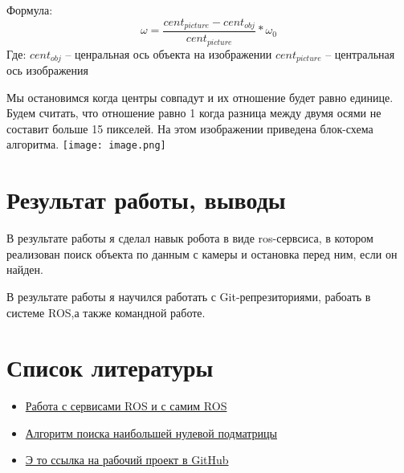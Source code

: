 \documentclass{article}
\begin{document}
    \newline
    Формула:
    \begin{displaymath}
        \omega= \frac{cent_{picture}-cent_{obj}}{cent_{picture}}  * \omega_0
    \end{displaymath}
    \newline Где:\newline
    $cent_{obj}$ -- ценральная ось объекта на изображении\newline
    $cent_{picture}$ -- центральная ось изображения
    \par Мы остановимся когда центры совпадут и их отношение будет равно единице.
    Будем считать, что отношение равно 1 когда разница между двумя осями не составит больше 15 пикселей.
    \newline На этом изображении приведена блок-схема алгоритма.\newline
    \texttt{[image: image.png]}
\section{Результат работы, выводы}
    В результате работы я сделал навык робота в виде ros-сервсиса, в котором реализован поиск объекта по данным с камеры и остановка перед ним, если он найден.\par
    В результате работы я научился работать с Git-репрезиториями, рабоать в системе ROS,а также командной работе.
\section{Список литературы}
    \begin{itemize}
        \item \textcolor{blue}{\href{http://wiki.ros.org/ru}{Работа с сервисами     ROS и     с самим ROS}}
        \item \textcolor{blue}{\href{https://e-maxx.ru/algo/maximum_zero_submatrix    }{Алгоритм поиска наибольшей нулевой подматрицы}}
        \item \textcolor{blue}{\href{https://github.com/Neuromatrix/ROS-camera-vie    w}{Э    то ссылка на рабочий проект в GitHub}}
    \end{itemize}

    
\end{document}
